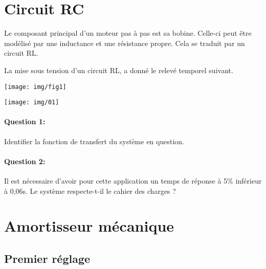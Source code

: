

\section{Circuit RC}

\begin{minipage}{0.48\linewidth}
Le composant principal d'un moteur pas à pas est sa bobine. Celle-ci peut être modélisé par une inductance et une résistance propre. Cela se traduit par un circuit RL.

La mise sous tension d'un circuit RL, a donné le relevé temporel suivant.
\end{minipage}\hfill
\begin{minipage}{0.48\linewidth}
\begin{center}
 \texttt{[image: img/fig1]}
\end{center}
\end{minipage}

\begin{center}
 \texttt{[image: img/01]}
\end{center}

\paragraph{Question 1:} Identifier la fonction de transfert du système en question.

\paragraph{Question 2:} Il est nécessaire d'avoir pour cette application un temps de réponse à 5\% inférieur à 0,06s. Le système respecte-t-il le cahier des charges ?

\newpage

\section{Amortisseur mécanique}


\subsection{Premier réglage}

